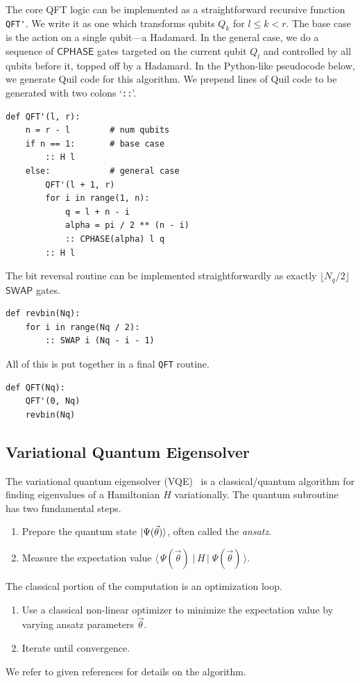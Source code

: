 \documentclass[conference]{IEEEtran}
\newcommand{\SWAP}{\ensuremath{\mathsf{SWAP}}}
\newcommand{\CPHASE}{\ensuremath{\mathsf{CPHASE}}}
\begin{document}
The core QFT logic can be implemented as a straightforward recursive function \verb|QFT'|. We write it as one which transforms qubits $Q_k$ for $l\le k<r$. The base case is the action on a single qubit---a Hadamard. In the general case, we do a sequence of \CPHASE{} gates targeted on the current qubit $Q_l$ and controlled by all qubits before it, topped off by a Hadamard. In the Python-like pseudocode below, we generate Quil code for this algorithm. We prepend lines of Quil code to be generated with two colons `\verb|::|'.
\begin{verbatim}
def QFT'(l, r):
    n = r - l        # num qubits
    if n == 1:       # base case
        :: H l
    else:            # general case
        QFT'(l + 1, r)
        for i in range(1, n):
            q = l + n - i
            alpha = pi / 2 ** (n - i)
            :: CPHASE(alpha) l q
        :: H l
\end{verbatim}
The bit reversal routine can be implemented straightforwardly as exactly $\lfloor N_q/2\rfloor$ \SWAP{} gates.
\begin{verbatim}
def revbin(Nq):
    for i in range(Nq / 2):
        :: SWAP i (Nq - i - 1)
\end{verbatim}
All of this is put together in a final \verb|QFT| routine.
\begin{verbatim}
def QFT(Nq):
    QFT'(0, Nq)
    revbin(Nq)
\end{verbatim}

\subsection{Variational Quantum Eigensolver}\label{sec:VQE}

The variational quantum eigensolver (VQE)~\cite{peruzzo2014variational, wecker2015progress, mcclean2015theory} is a classical/quantum algorithm for finding eigenvalues of a Hamiltonian $H$ variationally. The quantum subroutine has two fundamental steps.
\begin{enumerate}
\item Prepare the quantum state $\ket{\Psi(\vec\theta)}$, often called the \emph{ansatz}.
\item Measure the expectation value
$\langle\,\Psi(\vec\theta)\;|\,H\,|\;\Psi (\vec\theta)\,\rangle$.
\end{enumerate}
The classical portion of the computation is an optimization loop.
\begin{enumerate}
\item Use a classical non-linear optimizer to minimize the expectation value by varying ansatz parameters $\vec\theta$.
\item Iterate until convergence.
\end{enumerate}
We refer to given references for details on the algorithm.
\end{document}
